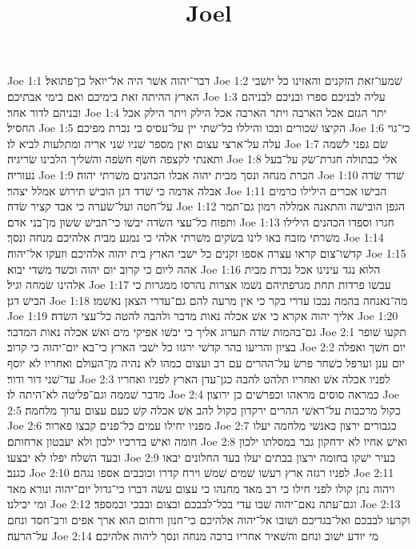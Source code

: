 

\title{Joel}

Joe 1:1  דבר־יהוה אשׁר היה אל־יואל בן־פתואל׃
Joe 1:2  שׁמעו־זאת הזקנים והאזינו כל יושׁבי הארץ ההיתה זאת בימיכם ואם בימי אבתיכם׃
Joe 1:3  עליה לבניכם ספרו ובניכם לבניהם ובניהם לדור אחר׃
Joe 1:4  יתר הגזם אכל הארבה ויתר הארבה אכל הילק ויתר הילק אכל החסיל׃
Joe 1:5  הקיצו שׁכורים ובכו והיללו כל־שׁתי יין על־עסיס כי נכרת מפיכם׃
Joe 1:6  כי־גוי עלה על־ארצי עצום ואין מספר שׁניו שׁני אריה ומתלעות לביא לו׃
Joe 1:7  שׂם גפני לשׁמה ותאנתי לקצפה חשׂף חשׂפה והשׁליך הלבינו שׂריגיה׃
Joe 1:8  אלי כבתולה חגרת־שׂק על־בעל נעוריה׃
Joe 1:9  הכרת מנחה ונסך מבית יהוה אבלו הכהנים משׁרתי יהוה׃
Joe 1:10  שׁדד שׂדה אבלה אדמה כי שׁדד דגן הובישׁ תירושׁ אמלל יצהר׃
Joe 1:11  הבישׁו אכרים הילילו כרמים על־חטה ועל־שׂערה כי אבד קציר שׂדה׃
Joe 1:12  הגפן הובישׁה והתאנה אמללה רמון גם־תמר ותפוח כל־עצי השׂדה יבשׁו כי־הבישׁ שׂשׂון מן־בני אדם׃
Joe 1:13  חגרו וספדו הכהנים הילילו משׁרתי מזבח באו לינו בשׂקים משׁרתי אלהי כי נמנע מבית אלהיכם מנחה ונסך׃
Joe 1:14  קדשׁו־צום קראו עצרה אספו זקנים כל ישׁבי הארץ בית יהוה אלהיכם וזעקו אל־יהוה׃
Joe 1:15  אהה ליום כי קרוב יום יהוה וכשׁד משׁדי יבוא׃
Joe 1:16  הלוא נגד עינינו אכל נכרת מבית אלהינו שׂמחה וגיל׃
Joe 1:17  עבשׁו פרדות תחת מגרפתיהם נשׁמו אצרות נהרסו ממגרות כי הבישׁ דגן׃
Joe 1:18  מה־נאנחה בהמה נבכו עדרי בקר כי אין מרעה להם גם־עדרי הצאן נאשׁמו׃
Joe 1:19  אליך יהוה אקרא כי אשׁ אכלה נאות מדבר ולהבה להטה כל־עצי השׂדה׃
Joe 1:20  גם־בהמות שׂדה תערוג אליך כי יבשׁו אפיקי מים ואשׁ אכלה נאות המדבר׃
Joe 2:1  תקעו שׁופר בציון והריעו בהר קדשׁי ירגזו כל ישׁבי הארץ כי־בא יום־יהוה כי קרוב׃
Joe 2:2  יום חשׁך ואפלה יום ענן וערפל כשׁחר פרשׂ על־ההרים עם רב ועצום כמהו לא נהיה מן־העולם ואחריו לא יוסף עד־שׁני דור ודור׃
Joe 2:3  לפניו אכלה אשׁ ואחריו תלהט להבה כגן־עדן הארץ לפניו ואחריו מדבר שׁממה וגם־פליטה לא־היתה לו׃
Joe 2:4  כמראה סוסים מראהו וכפרשׁים כן ירוצון׃
Joe 2:5  כקול מרכבות על־ראשׁי ההרים ירקדון כקול להב אשׁ אכלה קשׁ כעם עצום ערוך מלחמה׃
Joe 2:6  מפניו יחילו עמים כל־פנים קבצו פארור׃
Joe 2:7  כגבורים ירצון כאנשׁי מלחמה יעלו חומה ואישׁ בדרכיו ילכון ולא יעבטון ארחותם׃
Joe 2:8  ואישׁ אחיו לא ידחקון גבר במסלתו ילכון ובעד השׁלח יפלו לא יבצעו׃
Joe 2:9  בעיר ישׁקו בחומה ירצון בבתים יעלו בעד החלונים יבאו כגנב׃
Joe 2:10  לפניו רגזה ארץ רעשׁו שׁמים שׁמשׁ וירח קדרו וכוכבים אספו נגהם׃
Joe 2:11  ויהוה נתן קולו לפני חילו כי רב מאד מחנהו כי עצום עשׂה דברו כי־גדול יום־יהוה ונורא מאד ומי יכילנו׃
Joe 2:12  וגם־עתה נאם־יהוה שׁבו עדי בכל־לבבכם ובצום ובבכי ובמספד׃
Joe 2:13  וקרעו לבבכם ואל־בגדיכם ושׁובו אל־יהוה אלהיכם כי־חנון ורחום הוא ארך אפים ורב־חסד ונחם על־הרעה׃
Joe 2:14  מי יודע ישׁוב ונחם והשׁאיר אחריו ברכה מנחה ונסך ליהוה אלהיכם׃
